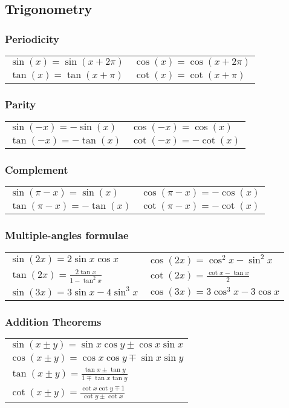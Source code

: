 \documentclass[a4paper, 10pt]{article}
\theoremstyle{definition}
\theoremstyle{ex}
\theoremstyle{named}
\begin{document}
\subsection*{Trigonometry}

\subsubsection*{Periodicity}
\begin{tabularx}{\linewidth}{XX}
    $\sin(x) = \sin(x + 2 \pi)$ & $\cos(x) = \cos(x + 2\pi)$ \\
    $\tan(x) = \tan(x + \pi)$ & $\cot(x) = \cot(x + \pi)$
\end{tabularx}

\subsubsection*{Parity}
\begin{tabularx}{\linewidth}{XX}
    $\sin(-x) = - \sin(x)$ & $\cos(-x) = \cos(x)$ \\
    $\tan(-x) = - \tan(x)$ & $\cot(-x) = -\cot(x)$
\end{tabularx}

\subsubsection*{Complement}
\begin{tabularx}{\linewidth}{XX}
    $\sin(\pi - x) = \sin(x)$ & $\cos(\pi - x) = -\cos(x)$ \\
    $\tan(\pi - x) = - \tan(x)$ & $\cot(\pi - x) = -\cot(x)$
\end{tabularx}

\subsubsection*{Multiple-angles formulae}
\begin{tabularx}{\linewidth}{XX}
    $\sin(2x) = 2 \sin x \cos x $ & $\cos(2x) = \cos^2x - \sin^2x$ \\
    $\tan(2x) = \frac{2 \tan x}{1 - \tan^2x}$ & $\cot(2x) = \frac{\cot x - \tan x}{2}$ \\
    $\sin(3x) = 3 \sin x - 4 \sin^3 x$ & $\cos(3x) = 3 \cos^3 x - 3 \cos x$
\end{tabularx}

\subsubsection*{Addition Theorems}
\begin{tabularx}{\linewidth}{X}
    $\sin(x \pm y) = \sin x \cos y \pm \cos x \sin x$ \\
    $\cos(x \pm y) = \cos x \cos y \mp \sin x \sin y$ \\
    $\tan(x \pm y) = \frac{\tan x \pm \tan y}{1 \mp \tan x \tan y}$ \\
    $\cot(x \pm y) = \frac{\cot x \cot y \mp 1}{\cot y \pm \cot x}$
\end{tabularx}
\end{document}
